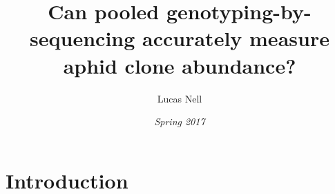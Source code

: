  
\iffalse
cd ./_paper
xelatex paper && biber paper && xelatex paper
rm *.log *.bcf *.aux *.bbl *.blg *.run.xml
\fi





\title{\vspace*{-3ex}Can pooled genotyping-by-sequencing accurately measure aphid clone 
abundance?}
\author{Lucas Nell}
\date{\vspace*{-3ex}\emph{Spring 2017}}



\maketitle

\raggedright

\section{Introduction}








